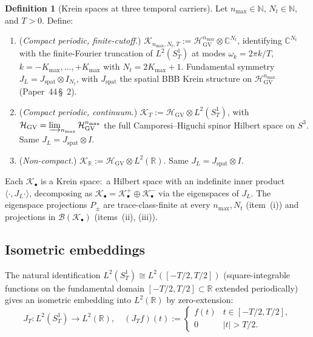 \documentclass[11pt,a4paper]{article}
\theoremstyle{plain}
\theoremstyle{definition}
\newtheorem{definition}[theorem]{Definition}
\newcommand{\nmax}{n_{\max}}
\newcommand{\Nt}{N_{t}}
\newcommand{\Kmax}{K_{\max}}
\newcommand{\sthree}{S^{3}}
\newcommand{\SoneT}{S^{1}_{T}}
\newcommand{\Krein}{\mathcal{K}}
\newcommand{\Bcal}{\mathcal{B}}
\newcommand{\R}{\mathbb{R}}
\newcommand{\C}{\mathbb{C}}
\newcommand{\N}{\mathbb{N}}
\newcommand{\JL}{J_{L}}
\newcommand{\HGV}{\mathcal{H}_{\mathrm{GV}}}
\newcommand{\Kplus}{\Krein^{+}}
\newcommand{\Kminus}{\Krein^{-}}
\newcommand{\spat}{\mathrm{spat}}
\begin{document}
\begin{definition}[Krein spaces at three temporal carriers]
\label{def:krein_spaces}
Let $\nmax \in \N$, $\Nt \in \N$, and $T > 0$. Define:
\begin{enumerate}
\item[(i)] (\emph{Compact periodic, finite-cutoff.})
$\Krein_{\nmax,\Nt,T} := \HGV^{\nmax} \otimes \C^{\Nt}$, identifying
$\C^{\Nt}$ with the finite-Fourier truncation of $L^{2}(\SoneT)$ at
modes $\omega_{k} = 2\pi k/T$, $k = -\Kmax, \ldots, +\Kmax$ with
$\Nt = 2\Kmax + 1$. Fundamental symmetry
$\JL = J_{\spat}\otimes I_{\Nt}$, with $J_{\spat}$ the spatial BBB
Krein structure on $\HGV^{\nmax}$ (Paper~44\,\S~2).
\item[(ii)] (\emph{Compact periodic, continuum.})
$\Krein_{T} := \HGV \otimes L^{2}(\SoneT)$, with $\HGV =
\varinjlim_{\nmax} \HGV^{\nmax}$ the full Camporesi--Higuchi spinor
Hilbert space on $\sthree$. Same $\JL = J_{\spat}\otimes I$.
\item[(iii)] (\emph{Non-compact.})
$\Krein_{\R} := \HGV \otimes L^{2}(\R)$. Same $\JL = J_{\spat}\otimes I$.
\end{enumerate}
\end{definition}

Each $\Krein_{\bullet}$ is a Krein space:\ a Hilbert space with an
indefinite inner product $\langle\cdot,\JL\cdot\rangle$, decomposing as
$\Krein_{\bullet} = \Kplus_{\bullet} \oplus \Kminus_{\bullet}$ via the
eigenspaces of $\JL$. The eigenspace projections $P_{\pm}$ are
trace-class-finite at every $\nmax, \Nt$ (item~(i)) and projections in
$\Bcal(\Krein_{\bullet})$ (items~(ii), (iii)).

\subsection{Isometric embeddings}\label{sec:setup_isometries}

The natural identification $L^{2}(\SoneT) \cong L^{2}([-T/2, T/2])$
(square-integrable functions on the fundamental domain
$[-T/2, T/2] \subset \R$ extended periodically) gives an isometric
embedding into $L^{2}(\R)$ by zero-extension:
\begin{equation}\label{eq:JT_definition}
J_{T} : L^{2}(\SoneT) \to L^{2}(\R), \quad
(J_{T} f)(t) := \begin{cases} f(t) & t \in [-T/2, T/2], \\
0 & |t| > T/2. \end{cases}
\end{equation}
\end{document}
